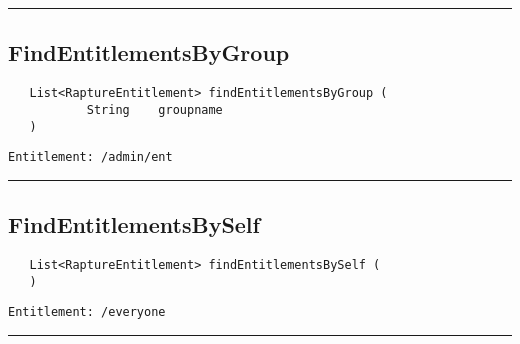 \rule{12cm}{2pt}
\subsection{FindEntitlementsByGroup}
\label{Api:FindEntitlementsByGroup}
\begin{Verbatim}
   List<RaptureEntitlement> findEntitlementsByGroup (
           String    groupname
   )
\end{Verbatim}
\begin{Verbatim}[formatcom=\color{Maroon}]
  Entitlement: /admin/ent
\end{Verbatim}



\rule{12cm}{2pt}
\subsection{FindEntitlementsBySelf}
\label{Api:FindEntitlementsBySelf}
\begin{Verbatim}
   List<RaptureEntitlement> findEntitlementsBySelf (
   )
\end{Verbatim}
\begin{Verbatim}[formatcom=\color{Maroon}]
  Entitlement: /everyone
\end{Verbatim}



\rule{12cm}{2pt}
